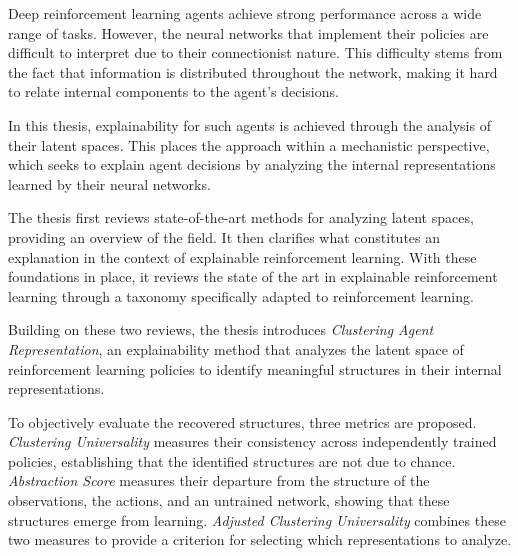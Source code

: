 \cleartorightpage
\ifprintversion\hbox{}\thispagestyle{empty}\newpage\fi
\centeredmargins
{}
\thispagestyle{empty}
\nolinenumbers
\label{chap:back_cover}
\begin{center}
  {\LARGE\bfseries \ThesisTitle\par}
  \medskip
  {\large \ThesisAuthor\par}
\end{center}
\bigskip

Deep reinforcement learning agents achieve strong performance across a wide range of tasks.
However, the neural networks that implement their policies are difficult to interpret due to their connectionist nature.
This difficulty stems from the fact that information is distributed throughout the network, making it hard to relate internal components to the agent's decisions.

In this thesis, explainability for such agents is achieved through the analysis of their latent spaces.
This places the approach within a mechanistic perspective, which seeks to explain agent decisions by analyzing the internal representations learned by their neural networks.

The thesis first reviews state-of-the-art methods for analyzing latent spaces, providing an overview of the field.
It then clarifies what constitutes an explanation in the context of explainable reinforcement learning.
With these foundations in place, it reviews the state of the art in explainable reinforcement learning through a taxonomy specifically adapted to reinforcement learning.

Building on these two reviews, the thesis introduces \textit{Clustering Agent Representation}, an explainability method that analyzes the latent space of reinforcement learning policies to identify meaningful structures in their internal representations.

To objectively evaluate the recovered structures, three metrics are proposed.
\textit{Clustering Universality} measures their consistency across independently trained policies, establishing that the identified structures are not due to chance.
\textit{Abstraction Score} measures their departure from the structure of the observations, the actions, and an untrained network, showing that these structures emerge from learning.
\textit{Adjusted Clustering Universality} combines these two measures to provide a criterion for selecting which representations to analyze.

